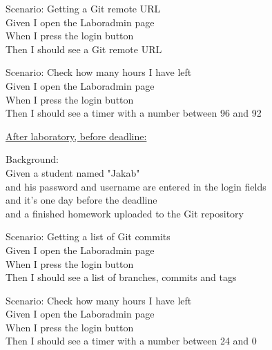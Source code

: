 Scenario: Getting a Git remote URL\\ \hspace*{1cm}
Given I open the Laboradmin page\\ \hspace*{1cm}
When I press the login button\\ \hspace*{1cm}
Then I should see a Git remote URL

Scenario: Check how many hours I have left\\ \hspace*{1cm}
Given I open the Laboradmin page\\ \hspace*{1cm}
When I press the login button\\ \hspace*{1cm}
Then I should see a timer with a number between 96 and 92\pagebreak



\underline{After laboratory, before deadline:}

Background:\\ \hspace*{1cm}
Given a student named "Jakab"\\ \hspace*{1cm}
and his password and username are entered in the login fields\\ \hspace*{1cm}
and it's one day before the deadline\\ \hspace*{1cm}
and a finished homework uploaded to the Git repository

Scenario: Getting a list of Git commits\\ \hspace*{1cm}
Given I open the Laboradmin page\\ \hspace*{1cm}
When I press the login button\\ \hspace*{1cm}
Then I should see a list of branches, commits and tags

Scenario: Check how many hours I have left\\ \hspace*{1cm}
Given I open the Laboradmin page\\ \hspace*{1cm}
When I press the login button\\ \hspace*{1cm}
Then I should see a timer with a number between 24 and 0


